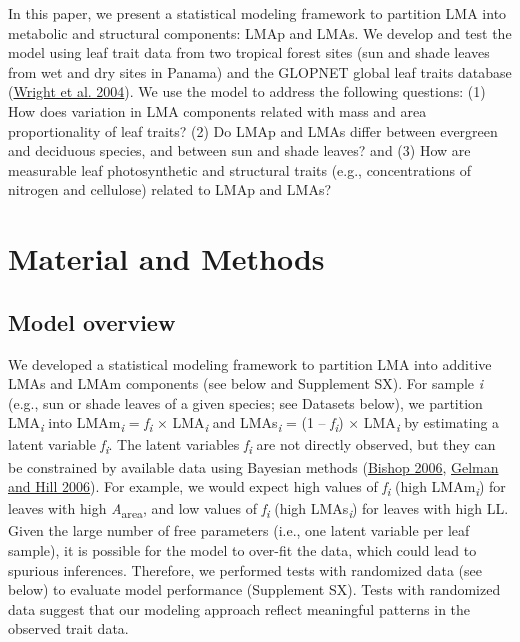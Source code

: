\documentclass[
  12pt,
]{article}
\begin{document}
In this paper, we present a statistical modeling framework to partition LMA into metabolic and structural components: LMAp and LMAs.
We develop and test the model using leaf trait data from two tropical forest sites (sun and shade leaves from wet and dry sites in Panama) and the GLOPNET global leaf traits database (\protect\hyperlink{ref-Wright2004a}{Wright et al. 2004}).
We use the model to address the following questions: (1) How does variation in LMA components related with mass and area proportionality of leaf traits? (2) Do LMAp and LMAs differ between evergreen and deciduous species, and between sun and shade leaves? and (3) How are measurable leaf photosynthetic and structural traits (e.g., concentrations of nitrogen and cellulose) related to LMAp and LMAs?

\hypertarget{material-and-methods}{%
\section{Material and Methods}\label{material-and-methods}}

\hypertarget{model-overview}{%
\subsection{Model overview}\label{model-overview}}

We developed a statistical modeling framework to partition LMA into additive LMAs and LMAm components (see below and Supplement SX).
For sample \emph{i} (e.g., sun or shade leaves of a given species; see Datasets below), we partition LMA\textsubscript{\emph{i}} into LMAm\textsubscript{\emph{i}} = \emph{f\textsubscript{i}} × LMA\textsubscript{\emph{i}} and LMAs\textsubscript{\emph{i}} = (1 -- \emph{f\textsubscript{i}}) × LMA\textsubscript{\emph{i}} by estimating a latent variable \emph{f\textsubscript{i}}.
The latent variables \emph{f\textsubscript{i}} are not directly observed, but they can be constrained by available data using Bayesian methods (\protect\hyperlink{ref-Bishop2006}{Bishop 2006}, \protect\hyperlink{ref-Gelman2006}{Gelman and Hill 2006}).
For example, we would expect high values of \emph{f\textsubscript{i}} (high LMAm\textsubscript{\emph{i}}) for leaves with high \emph{A}\textsubscript{area}, and low values of \emph{f\textsubscript{i}} (high LMAs\textsubscript{\emph{i}}) for leaves with high LL.
Given the large number of free parameters (i.e., one latent variable per leaf sample), it is possible for the model to over-fit the data, which could lead to spurious inferences.
Therefore, we performed tests with randomized data (see below) to evaluate model performance (Supplement SX).
Tests with randomized data suggest that our modeling approach reflect meaningful patterns in the observed trait data.
\end{document}
